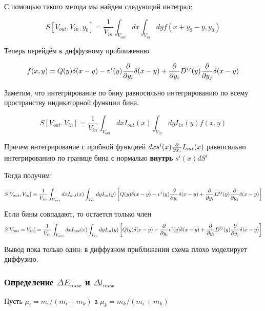 С помощью такого метода мы найдем следующий интеграл:

\begin{equation*}
	S[V_{out},V_{in}, y_0] = \frac{1}{V_{in}}\int_{V_{out}}{dx\int_{V_{in}}{dy f(x + y_0 - y,y_0)}}
\end{equation*}


Теперь перейдём к диффузному приближению.

\begin{equation*}
	f(x,y) = Q(y)\delta(x-y) -  v^i(y) \frac{\partial }{\partial y_i} \delta(x-y) + \frac{\partial }{\partial y_i} D^{ij}(y) \frac{\partial }{\partial y_j} \delta(x-y)
\end{equation*}

Заметим, что интегрирование по бину равносильно интегрированию по всему пространству индикаторной функции бина.

\begin{equation*}
	S[V_{out},V_{in}] = \frac{1}{V_{in}}\int_{V_{out}}{dx I_{out}(x)\int_{V_{in}}{dy I_{in}(y)f(x,y)}}
\end{equation*}

Причем интегрирование с пробной функцией $dx s^{i}(x)\frac{\partial }{\partial x_i} I_{out}(x)$ равносильно интегрированию по границе бина с нормалью \textbf{внутрь} $s^{i}(x) dS^i$

Тогда получим:

\begin{equation*}
	S[V_{out},V_{in}] = \frac{1}{V_{in}}\int_{V_{out}}{dx I_{out}(x)\int_{V_{in}}{dy I_{in}(y)
		\left[ Q(y)\delta(x-y) -  v^i(y) \frac{\partial }{\partial y_i} \delta(x-y) + \frac{\partial }{\partial y_i} D^{ij}(y) \frac{\partial }{\partial y_j} \delta(x-y) \right] 
	}}
\end{equation*}


Если бины совпадают, то остается только член 
\begin{equation*}
	S[V_{out} = V_{in}] = \frac{1}{V_{in}}\int_{V_{out}}{dx I_{out}(x)\int_{V_{in}}{dy I_{in}(y)
			\left[ Q(y)\delta(x-y) - \frac{\partial }{\partial y_i} v^i(y) \delta(x-y) + \frac{\partial }{\partial y_i} D^{ij}(y) \frac{\partial }{\partial y_j} \delta(x-y) \right] 
	}}
\end{equation*}

Вывод пока только один: в диффузном приближении схема плохо моделирует диффузию.

\subsubsection{Определение $\Delta E_{max}$ и  $\Delta l_{max}$}

Пусть $\mu_i = m_i/(m_i+m_k)$ а $\mu_k = m_k/(m_i+m_k)$ 
